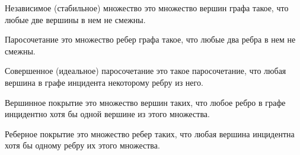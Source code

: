 \begin{definition}
  Независимое (стабильное) множество это множество вершин графа такое, что
  любые две вершины в нем не смежны.
\end{definition}

\begin{definition}
  Паросочетание это множество ребер графа такое, что любые два ребра в нем не
  смежны.
\end{definition}

\begin{definition}
  Совершенное (идеальное) паросочетание это такое паросочетание, что любая
  вершина в графе инцидента некоторому ребру из него.
\end{definition}

\begin{definition}
  Вершинное покрытие это множество вершин таких, что любое ребро в графе
  инцидентно хотя бы одной вершине из этого множества.
\end{definition}

\begin{definition}
  Реберное покрытие это множество ребер таких, что любая вершина инцидентна хотя
  бы одному ребру их этого множества.
\end{definition}
